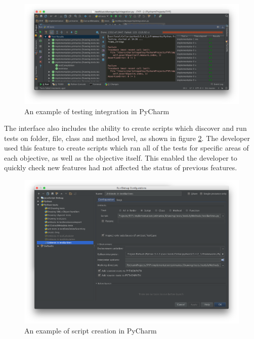 \begin{figure}[h]
	\centering
	\includegraphics[width=\textwidth]{testing_interface}	
	\caption{An example of testing integration in PyCharm}
	\label{fig:testing_interface}
\end{figure}

The interface also includes the ability to create scripts which discover and run tests on folder, file, class and method level, as shown in figure \ref{fig:testscript}. The developer used this feature to create scripts which ran all of the tests for specific areas of each objective, as well as the objective itself. This enabled the developer to quickly check new features had not affected the status of previous features. 
\begin{figure}[H]
	\centering
	\includegraphics[width=\textwidth]{create_test_script}	
	\caption{An example of script creation in PyCharm}
	\label{fig:testscript}
\end{figure}
